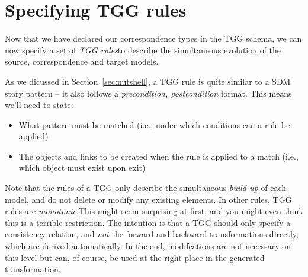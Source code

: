 \newpage
\section{Specifying TGG rules}
\genHeader

Now that we have declared our correspondence types in the TGG schema, we can now specify a set of \emph{TGG rules}to describe the simultaneous
evolution of the source, correspondence and target models.

As we dicussed in Section~\ref{sec:nutshell}, a TGG rule is quite similar to a SDM story pattern -- it also follows a \emph{precondition, postcondition}
format. This means we'll need to state:
\begin{itemize}
  \item What pattern must be matched (i.e., under which conditions can a rule be applied)
  \item The objects and links to be created when the rule is applied to a match  (i.e., which object must exist upon exit)
\end{itemize}

\vspace{0.5cm}

Note that the rules of a TGG only describe the simultaneous \emph{build-up} of each model, and do not delete or modify any existing elements. In other rules,
TGG rules are \emph{monotonic}.This might seem surprising at first, and you might even think this is a terrible restriction. The intention is
that a TGG should only specify a consistency relation, and \emph{not} the forward and backward transformations directly, which are derived automatically. In the
end, modifcations are not necessary on this level but can, of course, be used at the right place in the generated transformation.








